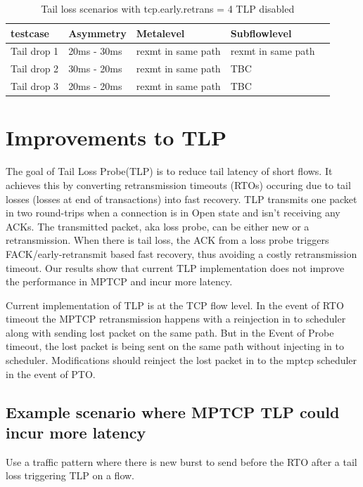 \documentclass[10pt,draftcls,twocolumn]{IEEEconf}
\begin{document}
\begin{table}[!ht]
\centering
\caption{Tail loss scenarios with tcp.early.retrans = 4 TLP disabled}
\label{ret4}
\begin{tabular}{|l|l|l|l|l|}
\hline
 testcase   & Asymmetry   & Metalevel          & Subflowlevel       &  \\\hline
Tail drop 1 & 20ms - 30ms & rexmt in same path & rexmt in same path &  \\\hline
Tail drop 2 & 30ms - 20ms & rexmt in same path & TBC                &  \\\hline
Tail drop 3 & 20ms - 20ms & rexmt in same path & TBC                & \\ \hline
\end{tabular}
\end{table}


\section{Improvements to TLP}
The goal of Tail Loss Probe(TLP) is to reduce tail latency of short flows. It achieves this by converting retransmission timeouts (RTOs) occuring due to tail losses (losses at end of transactions) into fast recovery. TLP transmits one packet in two round-trips when a connection is in Open state and isn't receiving any ACKs. The transmitted packet, aka loss probe, can be either new or a retransmission. When there is tail loss, the ACK from a loss probe triggers FACK/early-retransmit based fast recovery, thus avoiding a costly retransmission timeout. Our results show that current TLP implementation does not improve the performance in MPTCP and incur more latency.

Current implementation of TLP is at the TCP flow level. In the event of RTO timeout the MPTCP retransmission happens with a reinjection in to scheduler along with sending lost packet on the same path. But in the Event of Probe timeout, the lost packet is being sent on the same path without injecting in to scheduler.  Modifications should reinject the lost packet in to the mptcp scheduler in the event of PTO.

\subsection{Example scenario where MPTCP TLP could incur more latency}

Use a traffic pattern where there is new burst to send before the RTO after a tail loss triggering TLP on a flow.
\end{document}
